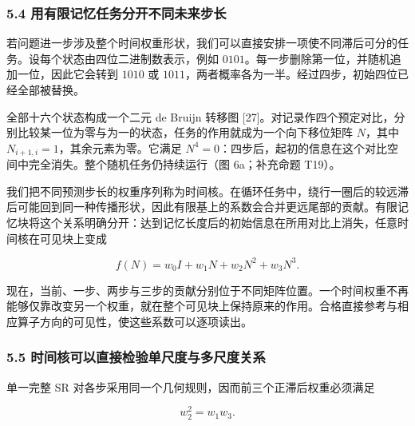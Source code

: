 \documentclass[11pt,a4paper]{article}
\begin{document}
\subsubsection{5.4
用有限记忆任务分开不同未来步长}\label{ux7528ux6709ux9650ux8bb0ux5fc6ux4efbux52a1ux5206ux5f00ux4e0dux540cux672aux6765ux6b65ux957f}

若问题进一步涉及整个时间权重形状，我们可以直接安排一项使不同滞后可分的任务。设每个状态由四位二进制数表示，例如
\(0101\)。每一步删除第一位，并随机追加一位，因此它会转到 \(1010\) 或
\(1011\)，两者概率各为一半。经过四步，初始四位已经全部被替换。

全部十六个状态构成一个二元 de Bruijn 转移图
{[}27{]}。对记录作四个预定对比，分别比较某一位为零与为一的状态，任务的作用就成为一个向下移位矩阵
\(N\)，其中 \(N_{i+1,i}=1\)，其余元素为零。它满足
\(N^4=0\)：四步后，起初的信息在这个对比空间中完全消失。整个随机任务仍持续运行（图
6a；补充命题 T19）。

\par
\noindent\begin{minipage}{\linewidth}

我们把不同预测步长的权重序列称为时间核。在循环任务中，绕行一圈后的较远滞后可能回到同一种传播形状，因此有限基上的系数会合并更远尾部的贡献。有限记忆块将这个关系明确分开：达到记忆长度后的初始信息在所用对比上消失，任意时间核在可见块上变成

\[
f(N)=w_0I+w_1N+w_2N^2+w_3N^3.
\]

\end{minipage}\par

现在，当前、一步、两步与三步的贡献分别位于不同矩阵位置。一个时间权重不再能够仅靠改变另一个权重，就在整个可见块上保持原来的作用。合格直接参考与相应算子方向的可见性，使这些系数可以逐项读出。

\subsubsection{5.5
时间核可以直接检验单尺度与多尺度关系}\label{ux65f6ux95f4ux6838ux53efux4ee5ux76f4ux63a5ux68c0ux9a8cux5355ux5c3aux5ea6ux4e0eux591aux5c3aux5ea6ux5173ux7cfb}

\par
\noindent\begin{minipage}{\linewidth}

单一完整 SR 对各步采用同一个几何规则，因而前三个正滞后权重必须满足

\[
w_2^2=w_1w_3.
\]

\end{minipage}\par
\end{document}
